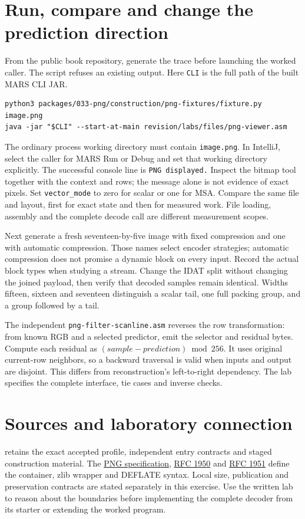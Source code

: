 \section{Run, compare and change the prediction direction}

From the public book repository, generate the trace before launching the worked
caller. The script refuses an existing output. Here \texttt{CLI} is the full
path of the built MARS CLI JAR.
\begin{Verbatim}
python3 packages/033-png/construction/png-fixtures/fixture.py image.png
java -jar "$CLI" --start-at-main revision/labs/files/png-viewer.asm
\end{Verbatim}
The ordinary process working directory must contain \texttt{image.png}.
In IntelliJ, select the caller for MARS Run or Debug and set that working
directory explicitly. The successful console line is \texttt{PNG displayed.}
Inspect the bitmap tool together with the context and rows; the message alone
is not evidence of exact pixels. Set \texttt{vector\_mode} to zero for scalar
or one for MSA. Compare the same file and layout, first for exact state and then
for measured work. File loading, assembly and the complete decode call are
different measurement scopes.

Next generate a fresh seventeen-by-five image with fixed compression and one
with automatic compression. Those names select encoder strategies; automatic
compression does not promise a dynamic block on every input. Record the actual
block types when studying a stream. Change the IDAT split without changing the
joined payload, then verify that decoded samples remain identical. Widths
fifteen, sixteen and seventeen distinguish a scalar tail, one full packing
group, and a group followed by a tail.

The independent \texttt{png-filter-scanline.asm} reverses the row transformation:
from known RGB and a selected predictor, emit the selector and residual bytes.
Compute each residual as $(sample-prediction)\bmod256$. It uses original
current-row neighbors, so a backward traversal is valid when inputs and output
are disjoint. This differs from reconstruction's left-to-right dependency.
The lab specifies the complete interface, tie cases and inverse checks.

\section*{Sources and laboratory connection}
 retains the exact accepted profile, independent entry
contracts and staged construction material. The
\href{https://www.w3.org/TR/png-3/}{PNG specification},
\href{https://www.rfc-editor.org/rfc/rfc1950}{RFC 1950} and
\href{https://www.rfc-editor.org/rfc/rfc1951}{RFC 1951} define the container,
zlib wrapper and DEFLATE syntax. Local size, publication and preservation
contracts are stated separately in this exercise. Use the written lab to
reason about the boundaries before implementing the complete decoder from its
starter or extending the worked program.
